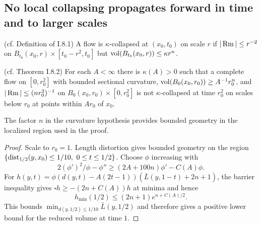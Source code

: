 \subsection{No local collapsing propagates forward in time and to larger scales}
\begin{definition}
  \label{def:kl-no-local-collapsing-propagates-forward-time-larger-scales-kappa-solutions-definition}


  (cf. Definition of I.8.1)
A flow is $\kappa$-collapsed at $(x_0,t_0)$ on scale $r$ if
$|\operatorname{Rm}|\le r^{-2}$ on $B_{t_0}(x_0,r)\times[t_0-r^2,t_0]$ but
$\operatorname{vol}(B_{t_0}(x_0,r))\le\kappa r^n$.
\end{definition}
\begin{theorem}
  \label{thm:kl-no-local-collapsing-propagates-forward-time-larger-scales-existence-kappa-solutions}
  (cf. Theorem I.8.2) \label{8.2thm}
For each $A<\infty$ there is $\kappa(A)>0$ such that a complete flow on
$[0,r_0^2]$ with bounded sectional curvature, $\operatorname{vol}(B_0(x_0,r_0))\ge A^{-1}r_0^n$,
and $|\operatorname{Rm}|\le(nr_0^2)^{-1}$ on $B_0(x_0,r_0)\times[0,r_0^2]$ is not
$\kappa$-collapsed at time $r_0^2$ on scales below $r_0$ at points within
$Ar_0$ of $x_0$.
\end{theorem}
\begin{remark}
  \label{rem:kl-no-local-collapsing-propagates-forward-time-larger-scales-estimates-no-local-collapsing-propagates-forward-time-larger-scales}
  \label{8.2fix}
The factor $n$ in the curvature hypothesis provides bounded geometry in the
localized region used in the proof.
\end{remark}
\begin{proof}
\sketch
Scale to $r_0=1$. Length distortion gives bounded geometry on the region
$\{\operatorname{dist}_{1/2}(y,x_0)\le1/10,\ 0\le t\le1/2\}$. Choose $\phi$ increasing with
\begin{equation}\label{phieqn}2(\phi')^2/\phi-\phi''\ge(2A+100n)\phi'-C(A)\phi.\end{equation}
For $h(y,t)=\phi(d(y,t)-A(2t-1))(\bar L(y,1-t)+2n+1)$, the barrier inequality gives
$\square h\ge-(2n+C(A))h$ at minima and hence
\begin{equation}h_{\min}(1/2)\le(2n+1)e^{n+C(A)/2}.
\end{equation}
This bounds $\min_{d(y,1/2)\le1/10}\bar L(y,1/2)$ and therefore gives a positive
lower bound for the reduced volume at time $1$.
\end{proof}

